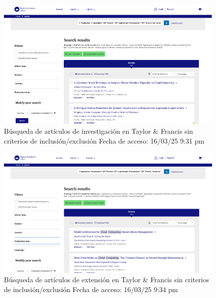 \begin{figure}[htbp]
    \centering
    \includegraphics[width=\textwidth,keepaspectratio]{apendices/BD/sin-criterios/TF-inv.png}
    \caption{Búsqueda de artículos de investigación en Taylor \& Francis sin criterios de inclusión/exclusión
    Fecha de acceso: 16/03/25 9:31 pm
    }\label{fig:busqueda14}
\end{figure}
\FloatBarrier

\begin{figure}[htbp]
    \centering
    \includegraphics[width=\textwidth,keepaspectratio]{apendices/BD/sin-criterios/TF-ind.png}
    \caption{Búsqueda de artículos de extensión en Taylor \& Francis sin criterios de inclusión/exclusión
    Fecha de acceso: 16/03/25 9:34 pm
    }\label{fig:busqueda15}
\end{figure}
\FloatBarrier

